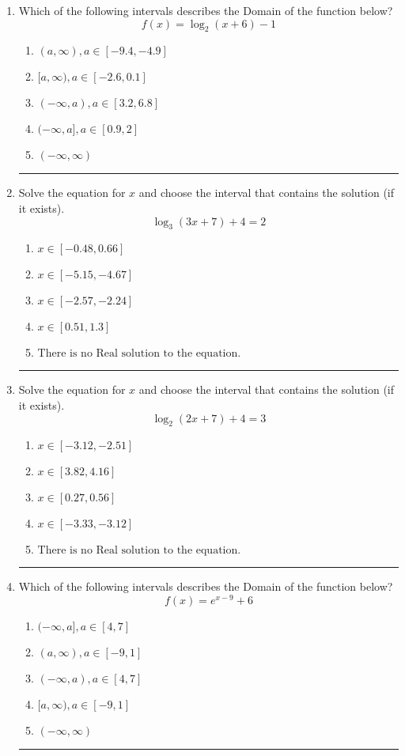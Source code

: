 \documentclass[14pt]{extbook}
\newcommand{\litem}[1]{\item#1\hspace*{-1cm}\rule{\textwidth}{0.4pt}}
\begin{document}
\begin{enumerate}
\litem{
Which of the following intervals describes the Domain of the function below?\[ f(x) = \log_2{(x+6)}-1 \]\begin{enumerate}[label=\Alph*.]
\item \( (a, \infty), a \in [-9.4, -4.9] \)
\item \( [a, \infty), a \in [-2.6, 0.1] \)
\item \( (-\infty, a), a \in [3.2, 6.8] \)
\item \( (-\infty, a], a \in [0.9, 2] \)
\item \( (-\infty, \infty) \)

\end{enumerate} }
\litem{
Solve the equation for $x$ and choose the interval that contains the solution (if it exists).\[ \log_{3}{(3x+7)}+4 = 2 \]\begin{enumerate}[label=\Alph*.]
\item \( x \in [-0.48, 0.66] \)
\item \( x \in [-5.15, -4.67] \)
\item \( x \in [-2.57, -2.24] \)
\item \( x \in [0.51, 1.3] \)
\item \( \text{There is no Real solution to the equation.} \)

\end{enumerate} }
\litem{
Solve the equation for $x$ and choose the interval that contains the solution (if it exists).\[ \log_{2}{(2x+7)}+4 = 3 \]\begin{enumerate}[label=\Alph*.]
\item \( x \in [-3.12, -2.51] \)
\item \( x \in [3.82, 4.16] \)
\item \( x \in [0.27, 0.56] \)
\item \( x \in [-3.33, -3.12] \)
\item \( \text{There is no Real solution to the equation.} \)

\end{enumerate} }
\litem{
Which of the following intervals describes the Domain of the function below?\[ f(x) = e^{x-9}+6 \]\begin{enumerate}[label=\Alph*.]
\item \( (-\infty, a], a \in [4, 7] \)
\item \( (a, \infty), a \in [-9, 1] \)
\item \( (-\infty, a), a \in [4, 7] \)
\item \( [a, \infty), a \in [-9, 1] \)
\item \( (-\infty, \infty) \)


\end{enumerate}}
\end{enumerate}
\end{document}
